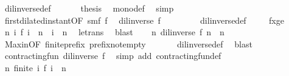 \begin{isabellebody}
\ dil{\isacharunderscore}inverse{\isacharunderscore}def\ \isacommand{{\isachardot}}\isamarkupfalse%
\isanewline
\ \ \isacommand{{\isacharbraceright}}\isamarkupfalse%
\ \isamarkupfalse%
\ {\isacharquery}thesis\ \isamarkupfalse%
\ mono{\isacharunderscore}def\ \isamarkupfalse%
\ simp\isanewline
\ \ \isamarkupfalse%
\isanewline
\isanewline
\ \ \isamarkupfalse%
\ first{\isacharunderscore}dilated{\isacharunderscore}instant{\isacharbrackleft}OF\ smf\ f{}{\isacharbrackright}\ \isamarkupfalse%
\ {}{\isacharcolon}{\isacartoucheopen}{\isacharparenleft}dil{\isacharunderscore}inverse\ f{\isacharparenright}\ {}\ {\isacharequal}\ {}{\isacartoucheclose}\isanewline
\ \ \ \ \isamarkupfalse%
\ dil{\isacharunderscore}inverse{\isacharunderscore}def\ \isacommand{{\isachardot}}\isamarkupfalse%
\isanewline
\isanewline
\ \ \isamarkupfalse%
\ fxge\ \isamarkupfalse%
\ {\isacartoucheopen}{\isasymforall}n\ i{\isachardot}\ f\ i\ {\isasymle}\ n\ {\isasymlongrightarrow}\ i\ {\isasymle}\ n{\isacartoucheclose}\ \isamarkupfalse%
\ le{\isacharunderscore}trans\ \isamarkupfalse%
\ blast\isanewline
\ \ \isamarkupfalse%
\ {}{\isacharcolon}{\isacartoucheopen}{\isasymforall}n{\isachardot}\ {\isacharparenleft}dil{\isacharunderscore}inverse\ f{\isacharparenright}\ n\ {\isasymle}\ n{\isacartoucheclose}\ \isamarkupfalse%
\ Max{\isacharunderscore}in{\isacharbrackleft}OF\ finite{\isacharunderscore}prefix\ prefix{\isacharunderscore}not{\isacharunderscore}empty{\isacharbrackright}\ \isanewline
\ \ \ \ \isamarkupfalse%
\ dil{\isacharunderscore}inverse{\isacharunderscore}def\ \isamarkupfalse%
\ blast\isanewline
\isanewline
\ \ \isamarkupfalse%
\ {}\ {}\ {}\ \isamarkupfalse%
\ {\isacharasterisk}{\isacharcolon}{\isacartoucheopen}contracting{\isacharunderscore}fun\ {\isacharparenleft}dil{\isacharunderscore}inverse\ f{\isacharparenright}{\isacartoucheclose}\ \isamarkupfalse%
\ {\isacharparenleft}simp\ add{\isacharcolon}\ contracting{\isacharunderscore}fun{\isacharunderscore}def{\isacharparenright}\isanewline
\ \ \isanewline
\ \ \isamarkupfalse%
\ {\isacartoucheopen}{\isasymforall}n{\isachardot}\ finite\ {\isacharbraceleft}i{\isachardot}\ f\ i\ {\isasymle}\ n{\isacharbraceright}{\isacartoucheclose}\ \isamarkupfalse%

\end{isabellebody}
